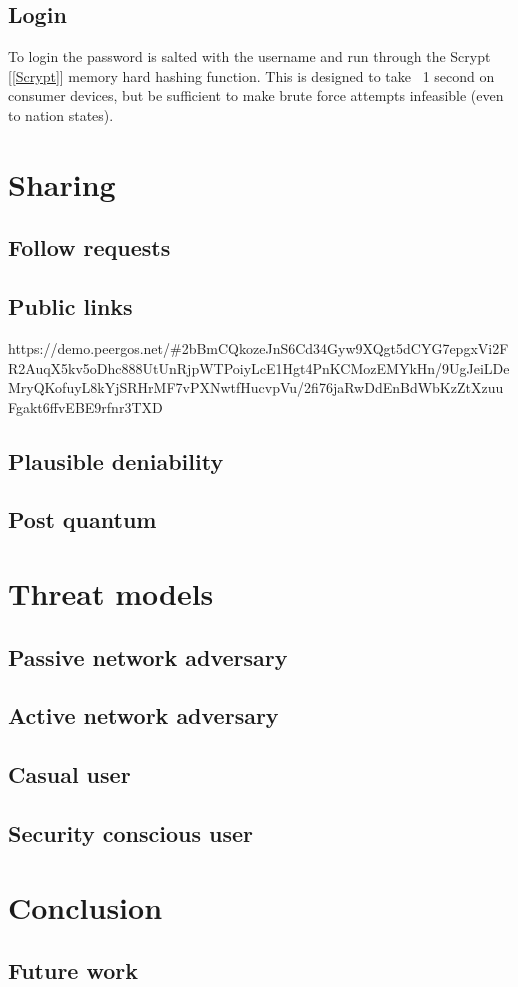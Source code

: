 \documentclass[12pt]{article}
\begin{document}
\subsection*{Login}
To login the password is salted with the username and run through the Scrypt [\ref{Scrypt}] memory hard hashing function. This is designed to take ~1 second on consumer devices, but be sufficient to make brute force attempts infeasible (even to nation states). 

\section*{Sharing}

\subsection*{Follow requests}

\subsection*{Public links}
https://demo.peergos.net/\#2bBmCQkozeJnS6Cd34Gyw9XQgt5dCYG7epgxVi2FR2AuqX5kv5oDhc888UtUnRjpWTPoiyLcE1Hgt4PnKCMozEMYkHn/9UgJeiLDeMryQKofuyL8kYjSRHrMF7vPXNwtfHucvpVu/2fi76jaRwDdEnBdWbKzZtXzuuFgakt6ffvEBE9rfnr3TXD


\subsection*{Plausible deniability}

\subsection*{Post quantum}

\section*{Threat models}

\subsection*{Passive network adversary}
\subsection*{Active network adversary}
\subsection*{Casual user}
\subsection*{Security conscious user}%

\section*{Conclusion}

\subsection*{Future work}
\end{document}
